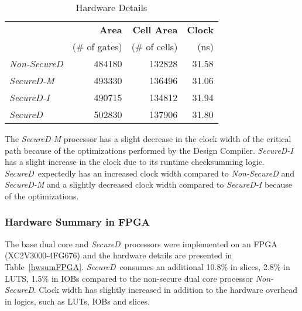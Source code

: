 \documentclass{article}
\newcommand{\SecureD}{\emph{SecureD}}
\begin{document}
\begin{table}[ht!]
\centering
\caption{Hardware Details} \label{hwdetails}
\begin{tabular}[t]{|l|r|r|r|}\hline
                  &{\bf Area}     &{\bf Cell Area}&{\bf Clock}\\
                  &{(\# of gates)}&{(\# of cells)}& {(ns)} \\ \hline\hline
\emph{Non-SecureD}& 484180        & 132828        & 31.58  \\ \hline
\emph{SecureD-M}  & 493330        & 136496        & 31.06  \\ \hline
\emph{SecureD-I}  & 490715        & 134812        & 31.94  \\ \hline
\emph{SecureD}    & 502830        & 137906        & 31.80  \\ \hline
\end{tabular}
\end{table}

The \emph{SecureD\nobreakdash-M} processor has a slight decrease in the clock width of  the
critical path because of the optimizations    performed by the Design
Compiler. \emph{SecureD\nobreakdash-I} has a slight increase in the clock due to its
runtime checksumming logic. \SecureD\     expectedly has an
increased clock width compared to \emph{Non-SecureD} and   \emph{SecureD\nobreakdash-M}
  and    a           slightly decreased clock width compared to
\emph{SecureD\nobreakdash-I} because of the optimizations.  

\subsubsection*{Hardware Summary in FPGA} \label{fpgaimpl}
The base dual   core  and \SecureD\ processors were implemented on an
FPGA (XC2V3000-4FG676) and the  hardware details       are
presented  in Table~\ref{hwsumFPGA}. \SecureD\ consumes an additional
10.8\% in       slices, 2.8\% in LUTS, 1.5\% in IOBs compared  to the
non-secure dual    core processor \emph{Non-SecureD}. Clock width has
slightly increased in addition to the hardware overhead in logics, such as LUTs, IOBs and slices.  
\end{document}

